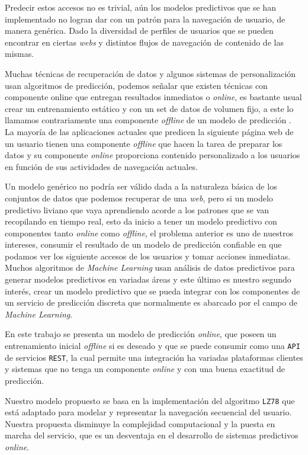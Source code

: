 {Predecir estos  accesos no es trivial, aún los modelos predictivos que se han implementado no logran dar con un patrón para la navegación de usuario, de manera genérica. Dado la diversidad de perfiles de usuarios que se pueden encontrar en ciertas \emph{webs}  y distintos flujos de navegación de contenido de las mismas.  

Muchas técnicas de recuperación de datos y algunos sistemas de personalización usan algoritmos de predicción, podemos señalar que existen técnicas con componente online que entregan resultados inmediatos o \emph{online}, es bastante usual crear un entrenamiento estático y con un set de datos de volumen fijo, a este lo llamamos contrariamente una componente \emph{offline} de un modelo de predicción . La mayoría de las aplicaciones actuales que predicen la siguiente página web de un usuario tienen una componente  \emph{offline} que hacen la tarea de preparar los datos y su componente \emph{online}  proporciona contenido personalizado a los usuarios en función de sus actividades de navegación actuales.

Un modelo genérico no podría ser válido dada a la naturaleza básica de los conjuntos de datos que podemos recuperar de una \emph{web}, pero si un modelo predictivo liviano que vaya aprendiendo acorde a los patrones que se van recopilando en tiempo real, esto da inicio a tener un modelo predictivo con componentes tanto \emph{online} como \emph{offline}, el problema anterior es uno de nuestros intereses, consumir el resultado de un modelo de predicción confiable en que podamos ver los siguiente accesos de los usuarios y tomar acciones inmediatas. Muchos algoritmos de \emph{Machine Learning} usan análisis de datos predictivos para generar modelos predictivos en variadas áreas y este último es nuestro segundo interés, crear un modelo predictivo que se pueda integrar con los componentes de un servicio de predicción discreta que normalmente es abarcado por el campo de \emph{Machine Learning}.  

En este trabajo se presenta un modelo de predicción \emph{online}, que poseen un entrenamiento inicial \emph{offline} si es deseado y que se puede consumir como una \texttt{API} de servicios \texttt{REST}, la cual permite una integración ha variadas plataformas clientes y sistemas que no tenga un componente \emph{online} y con una buena exactitud de predicción. 

Nuestro modelo propuesto se basa en la implementación del algoritmo \texttt{LZ78} que está adaptado para modelar y representar la navegación secuencial del usuario. Nuestra propuesta disminuye la complejidad computacional  y la puesta en marcha del servicio, que es un desventaja en el desarrollo de sistemas predictivos \emph{online}.
}
